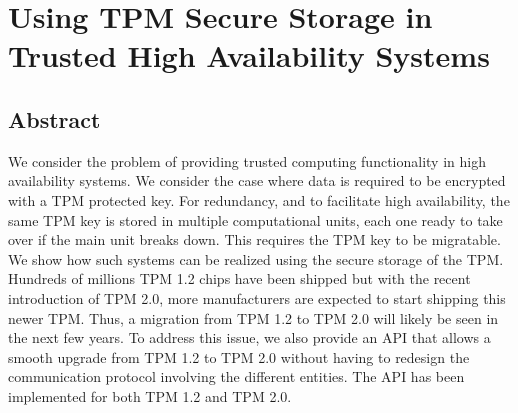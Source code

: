 \chapter[\paperItitle]{\texorpdfstring{%
		Using TPM Secure Storage in\\Trusted High Availability Systems}{%
		\paperItitle}}
\label{ch:tpmhas}
\paperRemark{\paperIref}

{

\makeatletter
\def\namedlabel#1#2{\begingroup
    #2%
    \def\@currentlabel{#2}%
    \phantomsection\label{#1}\endgroup    
}
\makeatother

\newenvironment{tpmcommands}{\begin{scriptsize}}{\end{scriptsize}}

\section*{Abstract}

We consider the problem of providing trusted computing functionality in high availability systems. We consider the case where data is required to be encrypted with a TPM protected key. For redundancy, and to facilitate high availability, the same TPM key is stored in multiple computational units, each one ready to take over if the main unit breaks down. This requires the TPM key to be migratable. We show how such systems can be realized using the secure storage of the TPM. Hundreds of millions TPM 1.2 chips have been shipped but with the recent introduction of TPM 2.0, more manufacturers are expected to start shipping this newer TPM. Thus, a migration from TPM 1.2 to TPM 2.0 will likely be seen in the next few years. To address this issue, we also provide an API that allows a smooth upgrade from TPM 1.2 to TPM 2.0 without having to redesign the communication protocol involving the different entities. The API has been implemented for both TPM 1.2 and TPM 2.0. 

}
